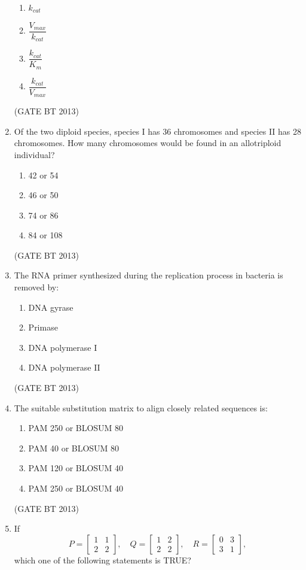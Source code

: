 \documentclass[journal,12pt,onecolumn]{IEEEtran}
\theoremstyle{remark}
\begin{document}
\begin{enumerate}
\begin{enumerate}[label=(\Alph*)]
    \item $k_{cat}$
    \item $\dfrac{V_{max}}{k_{cat}}$
    \item {$\dfrac{k_{cat}}{K_m}$} 
    \item $\dfrac{k_{cat}}{V_{max}}$
\end{enumerate} 
\hfill (GATE BT 2013)
\item 

Of the two diploid species, species I has 36 chromosomes and species II has 28 chromosomes. How many chromosomes would be found in an allotriploid individual?

\begin{enumerate}[label=(\Alph*)]
    \item 42 or 54
    \item 46 or 50
    \item 74 or 86
    \item 84 or 108
\end{enumerate} 
\hfill (GATE BT 2013)
\item 

The RNA primer synthesized during the replication process in bacteria is removed by:

\begin{enumerate}[label=(\Alph*)]
    \item DNA gyrase
    \item Primase
    \item DNA polymerase I
    \item DNA polymerase II
\end{enumerate} 
\hfill (GATE BT 2013)
\item 

The suitable substitution matrix to align closely related sequences is:

\begin{enumerate}[label=(\Alph*)]
    \item PAM 250 or BLOSUM 80
    \item PAM 40 or BLOSUM 80
    \item PAM 120 or BLOSUM 40
    \item PAM 250 or BLOSUM 40
\end{enumerate} 
\hfill (GATE BT 2013)
\item 

If 
\[
P = \begin{bmatrix} 1 & 1 \\ 2 & 2 \end{bmatrix}, \quad
Q = \begin{bmatrix} 1 & 2 \\ 2 & 2 \end{bmatrix}, \quad
R = \begin{bmatrix} 0 & 3 \\ 3 & 1 \end{bmatrix},
\]
which one of the following statements is TRUE?


\end{enumerate}
\end{document}
